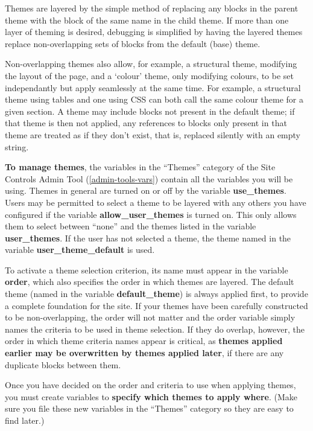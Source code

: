 Themes are layered by the simple method of replacing any blocks in the parent theme with the block of the same name in the child theme.  If more than one layer of theming is desired, debugging is simplified by having the layered themes replace non-overlapping sets of blocks from the default (base) theme.  

Non-overlapping themes also allow, for example, a structural theme, modifying the layout of the page, and a `colour' theme, only modifying colours, to be set independantly but apply seamlessly at the same time.  For example, a structural theme using tables and one using CSS can both call the same colour theme for a given section.  A theme may include blocks not present in the default theme; if that theme is then not applied, any references to blocks only present in that theme are treated as if they don't exist, that is, replaced silently with an empty string.

{\bf To manage themes}, the variables in the ``Themes'' category of the Site Controls Admin Tool (\ref{admin-tools-vars}) contain all the variables you will be using.  Themes in general are turned on or off by the variable {\bf use\_themes}.  Users may be permitted to select a theme to be layered with any others you have configured if the variable {\bf allow\_user\_themes} is turned on.  This only allows them to select between ``none'' and the themes listed in the variable {\bf user\_themes}.  If the user has not selected a theme, the theme named in the variable {\bf user\_theme\_default} is used.

To activate a theme selection criterion, its name must appear in the variable {\bf order}, which also specifies the order in which themes are layered.  The default theme (named in the variable {\bf default\_theme}) is always applied first, to provide a complete foundation for the site.  If your themes have been carefully constructed to be non-overlapping, the order will not matter and the order variable simply names the criteria to be used in theme selection.  If they do overlap, however, the order in which theme criteria names appear is critical, as {\bf themes applied earlier may be overwritten by themes applied later}, if there are any duplicate blocks between them.

Once you have decided on the order and criteria to use when applying themes, you must create variables to {\bf specify which themes to apply where}.  (Make sure you file these new variables in the ``Themes'' category so they are easy to find later.)

